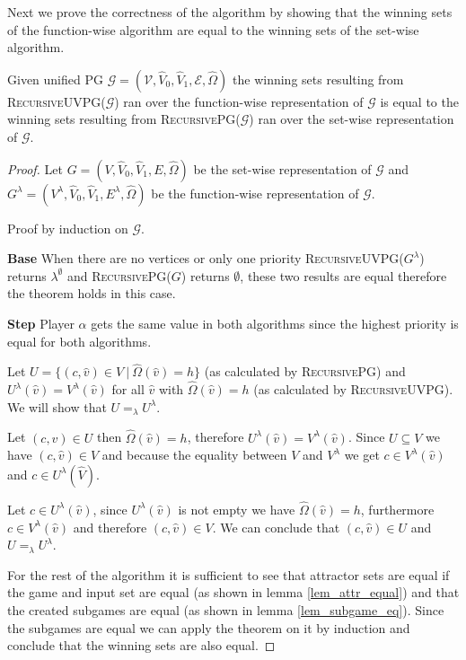 Next we prove the correctness of the algorithm by showing that the winning sets of the function-wise algorithm are equal to the winning sets of the set-wise algorithm.
\begin{theorem}
	Given unified PG $\mathcal{G} = (\mathcal{V},\hat{V}_0,\hat{V}_1, \mathcal{E}, \hat{\Omega})$ the winning sets resulting from \textsc{RecursiveUVPG($\mathcal{G}$)} ran over the function-wise representation of $\mathcal{G}$ is equal to the winning sets resulting from \textsc{RecursivePG($\mathcal{G}$)} ran over the set-wise representation of $\mathcal{G}$.
	\begin{proof}
		Let $G = (V,\hat{V}_0,\hat{V}_1,E,\hat{\Omega})$ be the set-wise representation of $\mathcal{G}$ and $G^\lambda = (V^\lambda, \hat{V}_0, \hat{V}_1, E^\lambda, \hat{\Omega})$ be the function-wise representation of $\mathcal{G}$.
		
		Proof by induction on $\mathcal{G}$.
		
		\textbf{Base} When there are no vertices or only one priority \textsc{RecursiveUVPG($G^\lambda$)} returns $\lambda^\emptyset$ and \textsc{RecursivePG($G$)} returns $\emptyset$, these two results are equal therefore the theorem holds in this case.
		
		\textbf{Step}
		Player $\alpha$ gets the same value in both algorithms since the highest priority is equal for both algorithms.
		
		Let $U = \{(c,\hat{v}) \in V\ |\ \hat{\Omega}(\hat{v}) = h \}$ (as calculated by \textsc{RecursivePG}) and $U^\lambda(\hat{v}) = V^\lambda(\hat{v})$ for all $\hat{v}$ with $\hat{\Omega}(\hat{v}) = h$ (as calculated by \textsc{RecursiveUVPG}). We will show that $U =_\lambda U^\lambda$.
		
		Let $(c,\hat{v}) \in U$ then $\hat{\Omega}(\hat{v}) = h$, therefore $U^\lambda(\hat{v}) = V^\lambda(\hat{v})$. Since $U \subseteq V$ we have $(c,\hat{v}) \in V$ and because the equality between $V$ and $V^\lambda$ we get $c \in V^\lambda(\hat{v})$ and $c \in U^\lambda(\hat{V})$.
		
		Let $c \in U^\lambda(\hat{v})$, since $U^\lambda(\hat{v})$ is not empty we have $\hat{\Omega}(\hat{v}) = h$, furthermore $c \in V^\lambda(\hat{v})$ and therefore $(c,\hat{v}) \in V$. We can conclude that $(c, \hat{v}) \in U$ and $U =_\lambda U^\lambda$.
		
		For the rest of the algorithm it is sufficient to see that attractor sets are equal if the game and input set are equal (as shown in lemma \ref{lem_attr_equal}) and that the created subgames are equal (as shown in lemma \ref{lem_subgame_eq}). Since the subgames are equal we can apply the theorem on it by induction and conclude that the winning sets are also equal.
	\end{proof}
\end{theorem}

